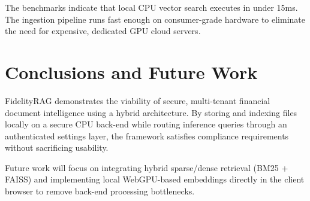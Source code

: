\documentclass[11pt,journal,onecolumn]{article}
\begin{document}
The benchmarks indicate that local CPU vector search executes in under 15ms. The ingestion pipeline runs fast enough on consumer-grade hardware to eliminate the need for expensive, dedicated GPU cloud servers.

\section{Conclusions and Future Work}
FidelityRAG demonstrates the viability of secure, multi-tenant financial document intelligence using a hybrid architecture. By storing and indexing files locally on a secure CPU back-end while routing inference queries through an authenticated settings layer, the framework satisfies compliance requirements without sacrificing usability. 

Future work will focus on integrating hybrid sparse/dense retrieval (BM25 + FAISS) and implementing local WebGPU-based embeddings directly in the client browser to remove back-end processing bottlenecks.
\end{document}
